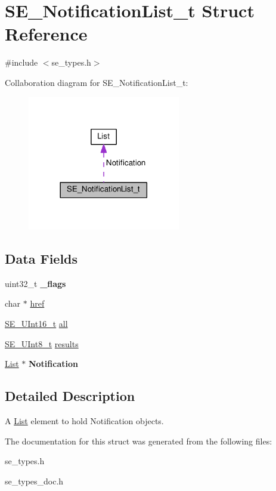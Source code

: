 \hypertarget{structSE__NotificationList__t}{}\section{S\+E\+\_\+\+Notification\+List\+\_\+t Struct Reference}
\label{structSE__NotificationList__t}


{\ttfamily \#include $<$se\+\_\+types.\+h$>$}



Collaboration diagram for S\+E\+\_\+\+Notification\+List\+\_\+t\+:\nopagebreak
\begin{figure}[H]
\begin{center}
\leavevmode
\includegraphics[width=189pt]{structSE__NotificationList__t__coll__graph}
\end{center}
\end{figure}
\subsection*{Data Fields}
\begin{DoxyCompactItemize}
\item 
uint32\+\_\+t {\bfseries \+\_\+flags}
\item 
char $\ast$ \hyperlink{group__NotificationList_ga04f41cbd1d96801ed0fed7c958e4b5b1}{href}
\item 
\hyperlink{group__UInt16_gac68d541f189538bfd30cfaa712d20d29}{S\+E\+\_\+\+U\+Int16\+\_\+t} \hyperlink{group__NotificationList_gacdc28bcbd39f7984a6ba52a731267bcc}{all}
\item 
\hyperlink{group__UInt8_gaf7c365a1acfe204e3a67c16ed44572f5}{S\+E\+\_\+\+U\+Int8\+\_\+t} \hyperlink{group__NotificationList_ga2a5654da4e99aa6515a308a702b7dee8}{results}
\item 
\hyperlink{structList}{List} $\ast$ {\bfseries Notification}
\end{DoxyCompactItemize}


\subsection{Detailed Description}
A \hyperlink{structList}{List} element to hold Notification objects. 

The documentation for this struct was generated from the following files\+:\begin{DoxyCompactItemize}
\item 
se\+\_\+types.\+h\item 
se\+\_\+types\+\_\+doc.\+h\end{DoxyCompactItemize}
